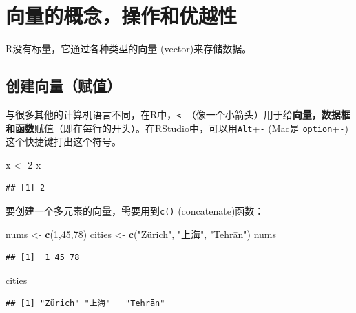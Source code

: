 \documentclass[]{book}
\newenvironment{Shaded}{\begin{snugshade}}{\end{snugshade}}
\newcommand{\DecValTok}[1]{\textcolor[rgb]{0.00,0.00,0.81}{#1}}
\newcommand{\KeywordTok}[1]{\textcolor[rgb]{0.13,0.29,0.53}{\textbf{#1}}}
\newcommand{\NormalTok}[1]{#1}
\newcommand{\StringTok}[1]{\textcolor[rgb]{0.31,0.60,0.02}{#1}}
\begin{document}
\hypertarget{vector-section}{%
\section{向量的概念，操作和优越性}\label{vector-section}}

R没有标量，它通过各种类型的向量 (vector)来存储数据。

\hypertarget{create-vector}{%
\subsection{创建向量（赋值）}\label{create-vector}}

与很多其他的计算机语言不同，在R中，\texttt{\textless{}-}（像一个小箭头）用于给\textbf{向量，数据框和函数}赋值（即在每行的开头）。在RStudio中，可以用\texttt{Alt}+\texttt{-} (Mac是 \texttt{option}+\texttt{-}) 这个快捷键打出这个符号。

\begin{Shaded}
\begin{Highlighting}[]
\NormalTok{x <-}\StringTok{ }\DecValTok{2}
\NormalTok{x}
\end{Highlighting}
\end{Shaded}

\begin{verbatim}
## [1] 2
\end{verbatim}

要创建一个多元素的向量，需要用到\texttt{c()} (concatenate)函数：

\begin{Shaded}
\begin{Highlighting}[]
\NormalTok{nums <-}\StringTok{ }\KeywordTok{c}\NormalTok{(}\DecValTok{1}\NormalTok{,}\DecValTok{45}\NormalTok{,}\DecValTok{78}\NormalTok{)}
\NormalTok{cities <-}\StringTok{ }\KeywordTok{c}\NormalTok{(}\StringTok{"Zürich", "}\NormalTok{上海}\StringTok{", "}\NormalTok{Tehrān}\StringTok{")}
\StringTok{nums}
\end{Highlighting}
\end{Shaded}

\begin{verbatim}
## [1]  1 45 78
\end{verbatim}

\begin{Shaded}
\begin{Highlighting}[]
\NormalTok{cities}
\end{Highlighting}
\end{Shaded}

\begin{verbatim}
## [1] "Zürich" "上海"   "Tehrān"
\end{verbatim}
\end{document}
